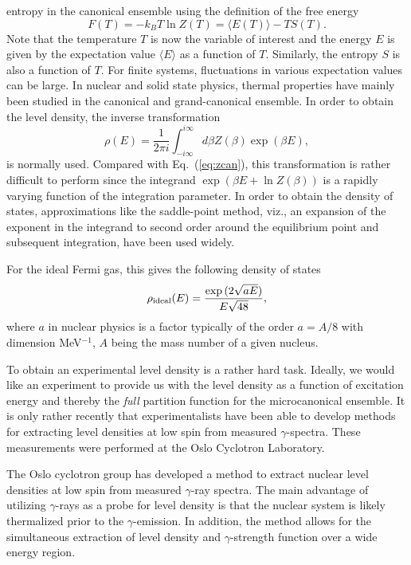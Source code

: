 \documentclass[%
oneside,                 %
final,                   %
10pt]{article}
\begin{document}
entropy in the canonical ensemble using the definition of the 
free energy 
\begin{equation}
     F(T)= -k_B T \ln Z(T)=\langle E(T)\rangle - TS(T).
\end{equation}
Note that the temperature $T$ is now the variable of 
interest and the energy $E$ is given by the expectation 
value $\langle E\rangle$ as a function of $T$. Similarly, 
the entropy $S$ is also a function of $T$.
For finite systems, fluctuations in various 
expectation values can be large.
In nuclear and solid state physics, thermal properties have 
mainly been studied in the canonical and grand-canonical ensemble. 
In order to obtain the level density, the inverse transformation 
\begin{equation}
      \rho(E) =\frac{1}{2\pi i}\int_{-i\infty}^{i\infty}
 d\beta Z(\beta) \exp{(\beta E)},
      \label{eq:zbigcan}
\end{equation}
is normally used. Compared with Eq.\ (\ref{eq:zcan}), this 
transformation is rather difficult to perform since 
the integrand $\exp{\left(\beta E+ \ln Z(\beta)\right)}$ is a 
rapidly varying function of the integration parameter. In order to obtain 
the density of states, approximations like the saddle-point 
method, viz., an expansion of the exponent in the integrand 
to second order around the equilibrium point and subsequent integration, 
have been used widely.

For the ideal Fermi gas, this gives the following density of states
\begin{equation}
      \rho_{\rm ideal}(E)=\frac{\exp{(2\sqrt{aE})}}{E\sqrt{48}},
      \label{eq:omegaideal}
\end{equation}
where $a$ in nuclear physics is a factor 
typically of the order $a=A/8$ with dimension 
MeV$^{-1}$, $A$ being the mass number of a given nucleus. 

To obtain an experimental level density is a rather hard task.
Ideally, we would like an experiment to provide us with the level 
density as a function of excitation energy and thereby 
the \emph{full} partition function for the microcanonical ensemble. 
It is only rather recently that 
experimentalists have been able to develop methods for extracting level densities at low spin from
measured $\gamma$-spectra. 
These measurements were performed at the Oslo 
Cyclotron Laboratory.

The Oslo cyclotron group has developed a method to 
extract nuclear level densities at low spin from 
measured $\gamma$-ray spectra.
The main advantage of utilizing $\gamma$-rays as a probe for 
level density is that the nuclear system is likely thermalized prior 
to the $\gamma$-emission. In addition, the method 
allows for the simultaneous extraction of level density 
and $\gamma$-strength function over a wide energy region. 
\end{document}
